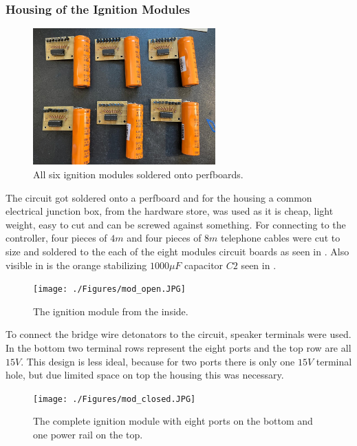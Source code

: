 \pagebreak

\subsubsection{Housing of the Ignition Modules}

\begin{figure}[!ht]
    \centering
    \includegraphics[width=7cm]{./Figures/raw_modules.jpeg}
    \caption{All six ignition modules soldered onto perfboards.}
    \label{fig:raw_modules}     
\end{figure}

\noindent The circuit got soldered onto a perfboard and for the housing a common electrical junction box, from the hardware store, was used as it is cheap, light weight, easy to cut and can be screwed against something. For connecting to the controller, four pieces of $4m$ and four pieces of $8m$ telephone cables were cut to size and soldered to the each of the eight modules circuit boards as seen in . Also visible in  is the orange stabilizing $1000 \mu F$ capacitor $C2$ seen in .

\begin{figure}[!ht]
    \centering
    \texttt{[image: ./Figures/mod\_open.JPG]}
    \caption{The ignition module from the inside.}
    \label{fig:mod_open}     
\end{figure}

\noindent To connect the bridge wire detonators to the circuit, speaker terminals were used.  In  the bottom two terminal rows represent the eight ports and the top row are all $15V$. This design is less ideal, because for two ports there is only one $15V$ terminal hole, but due limited space on top the housing this was necessary.  \\

\begin{figure}[!ht]
    \centering
    \texttt{[image: ./Figures/mod\_closed.JPG]}
    \caption{The complete ignition module with eight ports on the bottom and one power rail on the top.}
    \label{fig:mod_closed}     
\end{figure}
\pagebreak
